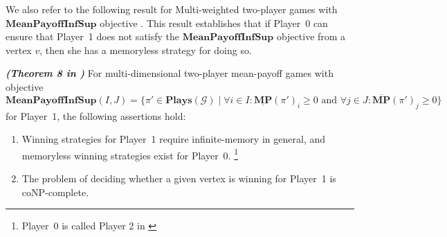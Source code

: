 \noindent We also refer to the following result for Multi-weighted two-player games with $\mathbf{MeanPayoffInfSup}$ objective \cite{VCDHRR15}. This result establishes that if Player~0 can ensure that Player~1 does not satisfy the $\mathbf{MeanPayoffInfSup}$ objective from a vertex $v$, then she has a memoryless strategy for doing so.

\begin{theorem}
    \label{ThmMemlessStrForP2}
    \textbf{\emph{(Theorem 8 in \cite{VCDHRR15})}} For multi-dimensional two-player mean-payoff games with objective \\
    $\mathbf{MeanPayoffInfSup}(I,J) = \{\pi' \in \mathbf{Plays}(\mathcal{G}) \mid \forall i \in I : \underline{\mathbf{MP}}(\pi')_i \geqslant 0 \text{ and } \forall j \in J : \overline{\mathbf{MP}}(\pi')_j \geqslant 0\}$ for Player~1, the following assertions hold:
    \begin{enumerate}
        \item Winning strategies for Player~1 require infinite-memory in general, and memoryless winning strategies exist for Player~0. \footnote{Player~0 is called Player 2 in \cite{FGR20}}
        \item The problem of deciding whether a given vertex is winning for Player~1 is coNP-complete.
    \end{enumerate}
\end{theorem}
 
